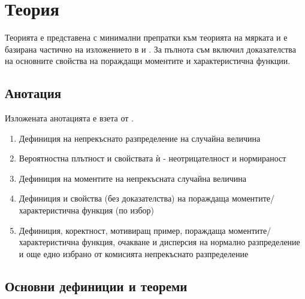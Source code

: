 \documentclass[
  headings=standardclasses,
  bibliography=totocnumbered,
]{scrartcl}
\title{\Title{16}}
\subtitle{Случайни величини с непрекъснати разпределения. Нормално разпределение. Равномерно разпределение, експоненциално разпределение или гама разпределение. Задачи, в които възникват.}
\author{Янис Василев}
\date{\Revision{23 юни 2019}}
\begin{document}
\maketitle

\section{Теория}

Теорията е представена с минимални препратки към теорията на мярката и е базирана частично на изложението в \cite{Borovkov} и \cite{DimitrovYanev}. За пълнота съм включил доказателства на основните свойства на пораждащи моментите и характеристична функции.

\subsection{Анотация}

Изложената анотацията е взета от \cite{Syllabus}.

\begin{enumerate}
  \item Дефиниция на непрекъснато разпределение на случайна величина
  \item Вероятностна плътност и свойствата ѝ - неотрицателност и нормираност
  \item Дефиниция на моментите на непрекъсната случайна величина
  \item Дефиниция и свойства (без доказателства) на пораждаща моментите/характеристична функция (по избор)
  \item Дефиниция, коректност, мотивиращ пример, пораждаща моментите/характеристична функция, очакване и дисперсия на нормално разпределение и още едно избрано от комисията непрекъснато разпределение
\end{enumerate}

\subsection{Основни дефиниции и теореми}
\end{document}
